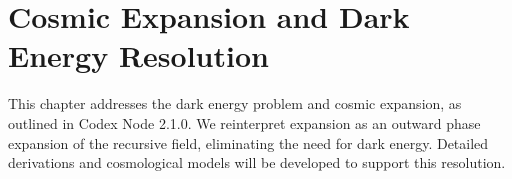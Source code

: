 \section{Cosmic Expansion and Dark Energy Resolution}
This chapter addresses the dark energy problem and cosmic expansion, as outlined in Codex Node 2.1.0. We reinterpret expansion as an outward phase expansion of the recursive field, eliminating the need for dark energy. Detailed derivations and cosmological models will be developed to support this resolution.